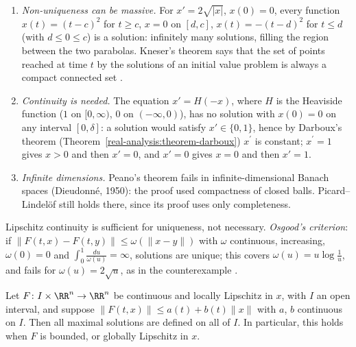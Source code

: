 \begin{counterexample}\label{ordinary-differential-equations:counterexample-peano}
\begin{enumerate}
\item \emph{Non-uniqueness can be massive.} For $x' = 2\sqrt{|x|}$, $x(0) = 0$, every function $x(t) = (t - c)^2$ for $t \geq c$, $x = 0$ on $[d, c]$, $x(t) = -(t - d)^2$ for $t \leq d$ (with $d \leq 0 \leq c$) is a solution:
infinitely many solutions, filling the region between the two parabolas. Kneser's theorem says that the set of points reached at time $t$ by the solutions of an initial value problem is always a compact connected set
\cite[Chapter II]{hartman-ode}.
\item \emph{Continuity is needed.} The equation $x' = H(-x)$, where $H$ is the Heaviside function ($1$ on $[0, \infty)$, $0$ on $(-\infty, 0)$), has no solution with $x(0) = 0$ on any interval $[0, \delta]$: a solution would
satisfy $x' \in \{0, 1\}$, hence by Darboux's theorem (Theorem~\ref{real-analysis:theorem-darboux}) $x^{\prime}$ is constant; $x^{\prime} = 1$ gives $x > 0$ and then $x' = 0$, and $x' = 0$ gives $x = 0$ and then $x' = 1$.
\item \emph{Infinite dimensions.} Peano's theorem fails in infinite-dimensional Banach spaces (Dieudonn\'e, 1950): the proof used compactness of closed balls. Picard--Lindel\"of still holds there, since its proof uses only
completeness.
\end{enumerate}
\end{counterexample}

\begin{remark}\label{ordinary-differential-equations:remark-osgood}
Lipschitz continuity is sufficient for uniqueness, not necessary. \emph{Osgood's criterion}: if $\|F(t, x) - F(t, y)\| \leq \omega(\|x - y\|)$ with $\omega$ continuous, increasing, $\omega(0) = 0$ and
$\int_0^1\frac{du}{\omega(u)} = \infty$, solutions are unique; this covers $\omega(u) = u\log\frac1u$, and fails for $\omega(u) = 2\sqrt u$, as in the counterexample \cite[Chapter III]{hartman-ode}.
\end{remark}

\begin{proposition}\label{ordinary-differential-equations:proposition-global}
Let $F \colon I \times \RR^n \to \RR^n$ be continuous and locally Lipschitz in $x$, with $I$ an open interval, and suppose $\|F(t, x)\| \leq a(t) + b(t)\|x\|$ with $a$, $b$ continuous on $I$. Then all maximal solutions are defined on
all of $I$. In particular, this holds when $F$ is bounded, or globally Lipschitz in $x$.
\end{proposition}

